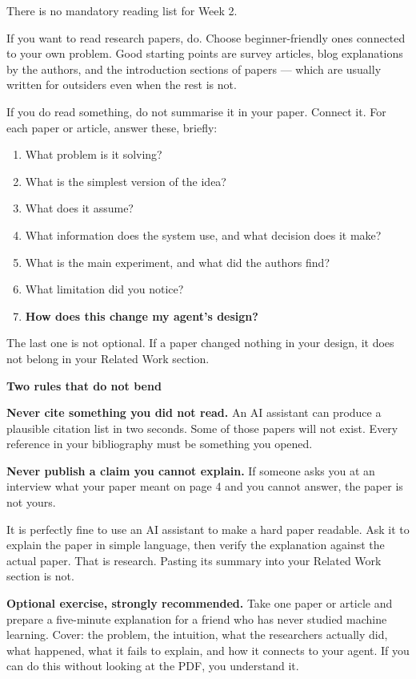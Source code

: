 \documentclass[11pt,a4paper]{article}
\newcommand{\boxtitle}[1]{{\bfseries #1}\par\vspace{2pt}}
\begin{document}
There is no mandatory reading list for Week 2.

If you want to read research papers, do. Choose beginner-friendly ones connected to your own
problem. Good starting points are survey articles, blog explanations by the authors, and the
introduction sections of papers --- which are usually written for outsiders even when the rest
is not.

If you do read something, do not summarise it in your paper. Connect it. For each paper or
article, answer these, briefly:

\begin{enumerate}[itemsep=1pt]
  \item What problem is it solving?
  \item What is the simplest version of the idea?
  \item What does it assume?
  \item What information does the system use, and what decision does it make?
  \item What is the main experiment, and what did the authors find?
  \item What limitation did you notice?
  \item \textbf{How does this change my agent's design?}
\end{enumerate}

The last one is not optional. If a paper changed nothing in your design, it does not belong in
your Related Work section.

\begin{sbbox}
\boxtitle{Two rules that do not bend}
\textbf{Never cite something you did not read.} An AI assistant can produce a plausible citation
list in two seconds. Some of those papers will not exist. Every reference in your bibliography
must be something you opened.

\textbf{Never publish a claim you cannot explain.} If someone asks you at an interview what your
paper meant on page 4 and you cannot answer, the paper is not yours.

It is perfectly fine to use an AI assistant to make a hard paper readable. Ask it to explain the
paper in simple language, then verify the explanation against the actual paper. That is
research. Pasting its summary into your Related Work section is not.
\end{sbbox}

\textbf{Optional exercise, strongly recommended.} Take one paper or article and prepare a
five-minute explanation for a friend who has never studied machine learning. Cover: the problem,
the intuition, what the researchers actually did, what happened, what it fails to explain, and
how it connects to your agent. If you can do this without looking at the PDF, you understand it.
\end{document}
